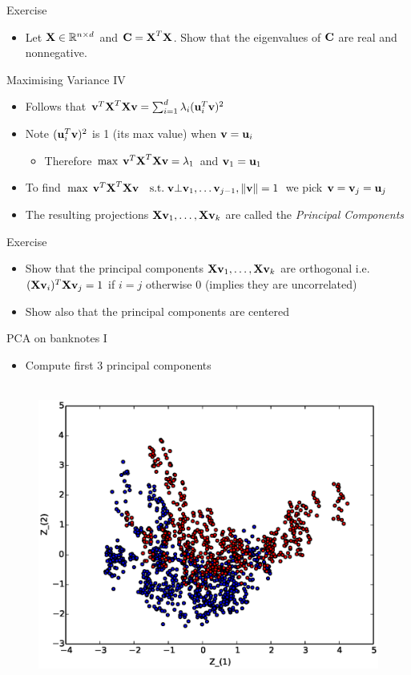 \documentclass{beamer}
\begin{document}
\begin{frame}{Exercise}
\begin{itemize} 
 \item Let $\textbf{X} \in \mathbb{R}^{n \times d}$ and $\textbf{C} = \textbf{X}^T\textbf{X}$. Show that the eigenvalues of $\textbf{C}$ are real and nonnegative. 
\end{itemize}
\end{frame}


\begin{frame}{Maximising Variance IV}  
\begin{itemize}
\item Follows that $\textbf{v}^T\textbf{X}^T\textbf{X}\textbf{v} = \sum_{i=1}^d \lambda_i (\textbf{u}_i^T\textbf{v})^2$
\item Note $(\textbf{u}_i^T\textbf{v})^2$ is 1 (its max value) when $\textbf{v} = \textbf{u}_i$
\begin{itemize}
\item Therefore $\max \; \textbf{v}^T\textbf{X}^T\textbf{X}\textbf{v} = \lambda_1$ and $\textbf{v}_1 = \textbf{u}_1$
\end{itemize}
\item To find $\max \; \textbf{v}^T\textbf{X}^T\textbf{X}\textbf{v} \quad \mbox{s.t.} \;  \textbf{v} \bot \textbf{v}_1, \ldots \textbf{v}_{j-1}, \|\textbf{v} \|  = 1$ we pick $\textbf{v} = \textbf{v}_{j} = \textbf{u}_{j}$
\item The resulting projections $\textbf{X}\textbf{v}_1, \ldots, \textbf{X}\textbf{v}_k$ are called the \emph{Principal Components} 
\end{itemize}
\end{frame}

\begin{frame}{Exercise}  
\begin{itemize} 
 \item Show that the principal components $\textbf{X}\textbf{v}_1, \ldots, \textbf{X}\textbf{v}_k$ are orthogonal i.e. $(\textbf{X}\textbf{v}_i)^T\textbf{X}\textbf{v}_j = 1$ if $i=j$ otherwise $0$ (implies they are uncorrelated)
 \item Show also that the principal components are centered 
\end{itemize}
\end{frame}

\begin{frame}{PCA on banknotes I} 
\begin{itemize}
 \item Compute first 3 principal components 
\end{itemize}
  \begin{figure}[htp]
\mbox{
\includegraphics[width=0.5\linewidth]{Z12.eps}
}
\end{figure} 
\end{frame}
\end{document}
